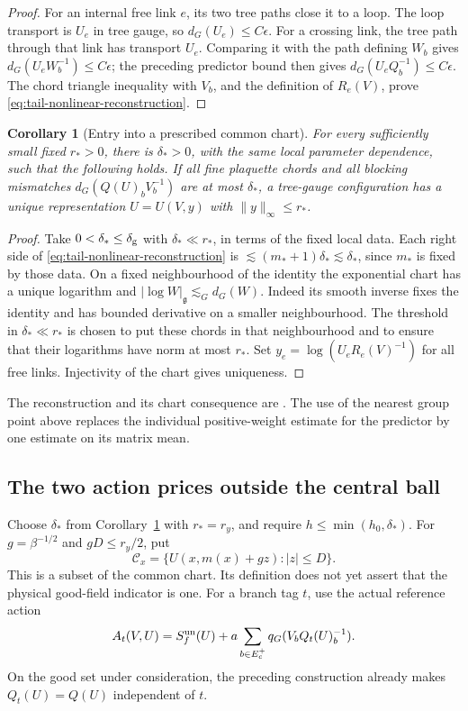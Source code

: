 \documentclass[11pt,reqno]{amsart}
\numberwithin{equation}{section}
\newtheorem{corollary}[theorem]{Corollary}
\theoremstyle{definition}
\theoremstyle{remark}
\newcommand{\g}{\mathfrak g}
\begin{document}
\begin{proof}
For an internal free link \(e\), its two tree paths
close it to a loop. The loop transport is \(U_e\)
in tree gauge, so \(d_G(U_e)\le C\epsilon\).
For a crossing link, the tree path through that link
has transport \(U_e\). Comparing it with the path
defining \(W_b\) gives
\(d_G(U_eW_b^{-1})\le C\epsilon\); the preceding predictor
bound then gives \(d_G(U_eQ_b^{-1})\le C\epsilon\).
The chord triangle inequality with \(V_b\), and the
definition of \(R_e(V)\), prove
\eqref{eq:tail-nonlinear-reconstruction}.
\end{proof}

\begin{corollary}[Entry into a prescribed common chart]
\label{cor:tail-common-chart}
For every sufficiently small fixed \(r_*>0\), there is
\(\delta_*>0\), with the same local parameter dependence,
such that the following holds. If all fine plaquette chords
and all blocking mismatches
\(d_G(Q(U)_bV_b^{-1})\) are at most \(\delta_*\), a
tree-gauge configuration has a unique representation
\(U=U(V,y)\) with \(\|y\|_\infty\le r_*\).
\end{corollary}
\begin{proof}
Take \(0<\delta_*\le\delta_{\rm g}\) with
\(\delta_*\ll r_*\), in terms of the fixed local data.
Each right side of \eqref{eq:tail-nonlinear-reconstruction}
is \(\lesssim(m_*+1)\delta_*\lesssim\delta_*\), since
\(m_*\) is fixed by those data. On a fixed neighbourhood
of the identity the exponential chart has a unique
logarithm and
\( |\log W|_{\g}\lesssim_G d_G(W)\).
Indeed its smooth inverse fixes the identity and has
bounded derivative on a smaller neighbourhood.
The threshold in \(\delta_*\ll r_*\) is chosen to put
these chords in that neighbourhood and to ensure that their
logarithms have norm at most \(r_*\).
Set \(y_e=\log(U_eR_e(V)^{-1})\) for all free links.
Injectivity of the chart gives uniqueness.
\end{proof}

The reconstruction and its chart consequence are
\cite[Lemma~14.8, Proposition~14.9, (14.18), and
Corollary~14.10, pp.~63--64]{Main}. The use of the nearest
group point above replaces the individual positive-weight
estimate for the predictor by one estimate on its matrix mean.


\subsection{The two action prices outside the central ball}

Choose \(\delta_*\) from Corollary~\ref{cor:tail-common-chart}
with \(r_*=r_y\), and require \(h\le\min(h_0,\delta_*)\).
For \(g=\beta^{-1/2}\) and \(gD\le r_y/2\), put
\begin{equation}
       \mathcal C_x
         =\{U(x,m(x)+gz):|z|\le D\}.
 \label{eq:tail-central-set}
\end{equation}
This is a subset of the common chart. Its definition does
not yet assert that the physical good-field indicator is one.
For a branch tag \(t\), use the actual reference action
\[
       A_t(V,U)=S_f^{\rm un}(U)
                     +a\sum_{b\in E_c^+}q_G(V_bQ_t(U)_b^{-1}).
\]
On the good set under consideration, the preceding construction
already makes \(Q_t(U)=Q(U)\) independent of \(t\).
\end{document}
